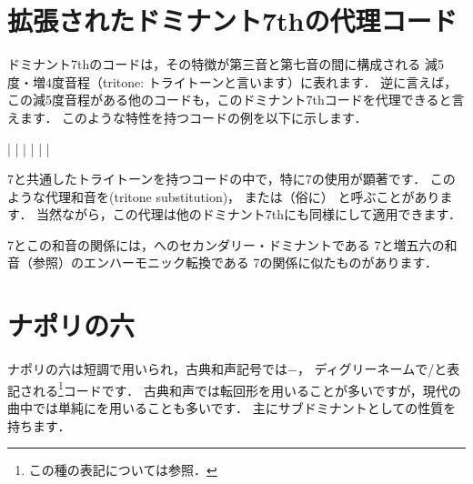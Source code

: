 \documentclass[dvipdfmx,uplatex,b5paper,openany,jbase=12Q,nomag*,textwidth-limit=44%
               ]{gachimuchi}[2020/05/05]
\begin{document}
\section{拡張されたドミナント7thの代理コード}
ドミナント7thのコードは，その特徴が第三音と第七音の間に構成される
減5度・増4度音程（tritone: トライトーンと言います）に表れます．
逆に言えば，この減5度音程がある他のコードも，このドミナント7thコードを代理できると言えます．
このような特性を持つコードの例を以下に示します．

\begin{Music}[0.7\linewidth]
  \generalmeter{\meterC}
  \Startpiece
  \NOTes%
  |%
  \en\doublebar%
  \NOTes%
  |%
  \en\bar%
  \NOTes%
  |%
  \en\bar%
  \NOTes%
  |%
  \en\setdoublebar%
  \endpiece
\end{Music}

\Gnv\subsc7と共通したトライトーンを持つコードの中で，特に\bFlat\Gnii\subsc7の使用が顕著です．
このような代理和音を\xkanjispace(tritone substitution)，
または（俗に） と呼ぶことがあります．
当然ながら，この代理は他のドミナント7thにも同様にして適用できます．

\Gnv\subsc7とこの和音の関係には，\Gnv へのセカンダリー・ドミナントである
\Gnii\subsc7と増五六の和音（参照）のエンハーモニック転換である
\bFlat\Gnvi\subsc7の関係に似たものがあります．

\section{ナポリの六}
ナポリの六は短調で用いられ，古典和声記号では$-$\Gnii{}，
ディグリーネームで\bFlat\Gnii /\Gniv と表記される\footnote{
  この種の表記については参照．
}コードです．
古典和声では転回形を用いることが多いですが，現代の曲中では単純に\bFlat\Gnii を用いることも多いです．
主にサブドミナントとしての性質を持ちます．
\end{document}
